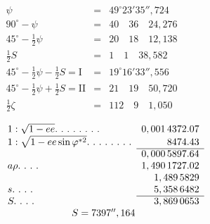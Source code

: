 \clearpage
\noindent{}\makebox[12mm][r]{}\par\medskip
\begingroup\small
\noindent\begin{minipage}[t]{.52\linewidth}\vspace{0pt}\centering
\(\begin{array}{rcl}
\psi&=&49^\circ23'35'',724\\
90^\circ-\psi&=&40\quad36\quad24,276\\
45^\circ-\tfrac12\psi&=&20\quad18\quad12,138\\
\tfrac12S&=&1\quad1\quad38,582\\
45^\circ-\tfrac12\psi-\tfrac12S=\mathrm{I}&=&19^\circ16'33'',556\\
45^\circ-\tfrac12\psi+\tfrac12S=\mathrm{II}&=&21\quad19\quad50,720\\
\tfrac12\zeta&=&112\quad9\quad1,050
\end{array}\)
\end{minipage}\hfill
\begin{minipage}[t]{.46\linewidth}\vspace{0pt}\centering
\(\begin{array}{lr}
1:\sqrt{1-ee}\ldotp\,\ldotp\,\ldotp\,\ldotp\,\ldotp\,\ldotp\,\ldotp\,\ldotp&0,001\,4372.07\\
1:\sqrt{1-ee\sin\varphi^{*2}}\ldotp\,\ldotp\,\ldotp\,\ldotp\,\ldotp\,\ldotp\,\ldotp\,\ldotp&8474.43\\\cline{2-2}
&0,000\,5897.64\\
a\rho\ldotp\,\ldotp\,\ldotp\,\ldotp&1,490\,1727.02\\
&1,489\,5829\\
s\ldotp\,\ldotp\,\ldotp\,\ldotp&5,358\,6482\\\cline{2-2}
S\ldotp\,\ldotp\,\ldotp\,\ldotp&3,869\,0653\\
\multicolumn2c{S=7397'',164}
\end{array}\)
\end{minipage}
\par\medskip
